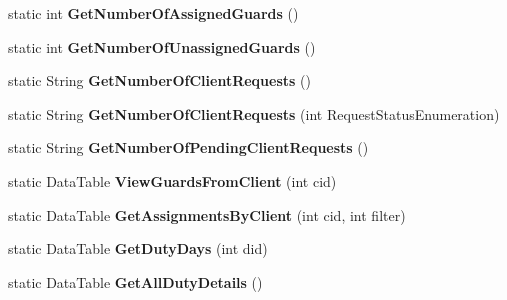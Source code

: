 \begin{DoxyCompactItemize}
static int {\bfseries Get\+Number\+Of\+Assigned\+Guards} ()
\item 
\mbox{\label{class_m_s_a_m_i_s_user_interface_1_1_scheduling_a40fb4274a0c0d8361a0af0bf5653175e}} 
static int {\bfseries Get\+Number\+Of\+Unassigned\+Guards} ()
\item 
\mbox{\label{class_m_s_a_m_i_s_user_interface_1_1_scheduling_a41f09621900a2ffd2901a493a3a7fed6}} 
static String {\bfseries Get\+Number\+Of\+Client\+Requests} ()
\item 
\mbox{\label{class_m_s_a_m_i_s_user_interface_1_1_scheduling_a6343cf90f6fe9d885560bc7b083bc0a5}} 
static String {\bfseries Get\+Number\+Of\+Client\+Requests} (int Request\+Status\+Enumeration)
\item 
\mbox{\label{class_m_s_a_m_i_s_user_interface_1_1_scheduling_a70744c37691d6dc259c4df672e3a21dc}} 
static String {\bfseries Get\+Number\+Of\+Pending\+Client\+Requests} ()
\item 
\mbox{\label{class_m_s_a_m_i_s_user_interface_1_1_scheduling_a5b9e436b037a6619cadf175bb43b90b2}} 
static Data\+Table {\bfseries View\+Guards\+From\+Client} (int cid)
\item 
\mbox{\label{class_m_s_a_m_i_s_user_interface_1_1_scheduling_a065ce30f148c6eae68c77bf1d9b385d8}} 
static Data\+Table {\bfseries Get\+Assignments\+By\+Client} (int cid, int filter)
\item 
\mbox{\label{class_m_s_a_m_i_s_user_interface_1_1_scheduling_abe50b9da4c1f84ebf1fb2d7de3a4ac16}} 
static Data\+Table {\bfseries Get\+Duty\+Days} (int did)
\item 
\mbox{\label{class_m_s_a_m_i_s_user_interface_1_1_scheduling_a5c6859d668bf4e2b25d7e32e8dec1dae}} 
static Data\+Table {\bfseries Get\+All\+Duty\+Details} ()
\item 
\mbox{\label{class_m_s_a_m_i_s_user_interface_1_1_scheduling_a8882732bec705c01f9f84b7688198739}} 

\end{DoxyCompactItemize}
